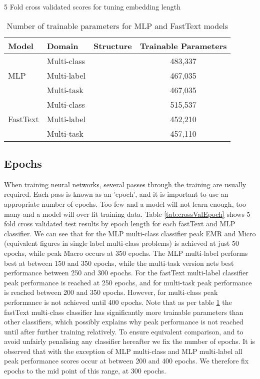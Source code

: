 \documentclass[Dissertation.tex]{subfiles}
\begin{document}
\begin{table}
	\caption{5 Fold cross validated scores for tuning embedding length }
	\label{tab:embedTuning}
	\centering
	
\end{table}

\begin{table}[]
	\caption{ Number of trainable parameters for MLP and FastText models }
	\label{tab:trainParams}
	\centering
	\begin{tabular}{lllc}
		\toprule
		Model    & Domain      & Structure & Trainable Parameters \\ \midrule
		\multirow{3}{*}{MLP}      & Multi-class &           & 483,337               \\
		& Multi-label &           & 467,035               \\
		& Multi-task  &           & 467,035               \\
		\cmidrule{2-4}
		\multirow{3}{*}{FastText} & Multi-class &           & 515,537               \\
		& Multi-label &           & 452,210               \\
		& Multi-task  &           & 457,110 \\ \bottomrule              
	\end{tabular}
	
\end{table}

\subsection{Epochs} \label{sec:epochs}
When training neural networks, several passes through the training are usually required. Each pass is known as an 'epoch', and it is important to use an appropriate number of epochs. Too few and a model will not learn enough, too many and a model will over fit training data. Table \ref{tab:crossValEpoch} shows 5 fold cross validated test results by epoch length for each fastText and MLP classifier. We can see that for
the MLP multi-class classifier peak EMR and \f{Micro} (equivalent figures in single label multi-class problems) is achieved at just 50 epochs, while peak \f{Macro} occurs at 350 epochs. The MLP multi-label performs best at between 150 and 350 epochs, while the multi-task version nets best performance between 250 and 300 epochs. For the fastText multi-label classifier peak performance is reached at 250 epochs, and for multi-task peak performance is reached between 200 and 350 epochs. However, for multi-class peak performance is not achieved until 400 epochs. Note that as per table \ref{tab:trainParams} the fastText multi-class classifier has significantly more trainable parameters than other classifiers, which possibly explains why peak performance is not reached until after further training relatively. To ensure equivalent comparison, and to avoid unfairly penalising any classifier hereafter we fix the number of epochs. It is observed that with the exception of MLP multi-class and MLP multi-label all peak performance scores occur at between 200 and 400 epochs. We therefore fix epochs to the mid point of this range, at 300 epochs.
\end{document}
